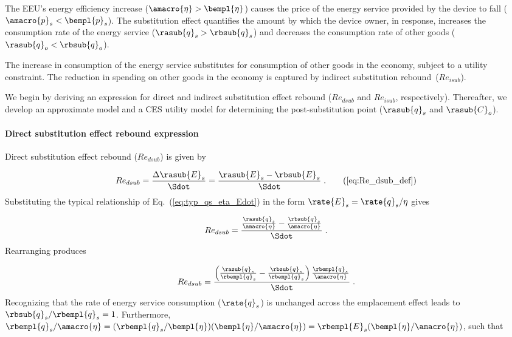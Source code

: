 The EEU's energy efficiency increase
($\amacro{\eta} > \bempl{\eta}$)
causes the price of the energy service provided by the device to fall
($\amacro{p}_s < \bempl{p}_s$).
The substitution effect quantifies the amount by which
the device owner, in response,
increases the consumption rate of the energy service ($\rasub{q}_s > \rbsub{q}_s$) and
decreases the consumption rate of other goods ($\rasub{q}_o < \rbsub{q}_o$).

The increase in consumption of the energy service 
substitutes for consumption of other goods in the economy,
subject to a utility constraint.
The reduction in spending on other goods in the economy
is captured by indirect substitution rebound~($Re_{isub}$).

We begin by deriving an expression for direct and indirect 
substitution effect rebound ($Re_{dsub}$ and $Re_{isub}$, respectively).
Thereafter, we develop an approximate model and a CES utility model for determining the 
post-substitution point ($\rasub{q}_s$ and $\rasub{C}_o$).


\paragraph{Direct substitution effect rebound expression}
\label{sec:Redsub_expression}

Direct substitution effect rebound ($Re_{dsub}$) is given by

\begin{equation}
  Re_{dsub} = \frac{\Delta \rasub{E}_s}{\Sdot} = \frac{\rasub{E}_s - \rbsub{E}_s}{\Sdot} \; . \tag{\ref{eq:Re_dsub_def}}
\end{equation}
%
Substituting the typical relationship of Eq.~(\ref{eq:typ_qs_eta_Edot})
in the form $\rate{E}_s = \rate{q}_s/\eta$ gives

\begin{equation}
  Re_{dsub} = \frac{\frac{\rasub{q}_s}{\amacro{\eta}} - \frac{\rbsub{q}_s}{\amacro{\eta}}}{\Sdot} \; .
\end{equation}
%
Rearranging produces

\begin{equation}
  Re_{dsub} = \frac{ \left( \frac{\rasub{q}_s}{\rbempl{q}_s}
                    - \frac{\rbsub{q}_s}{\rbempl{q}_s}  \right) \frac{\rbempl{q}_s}{\amacro{\eta}} }{\Sdot} \; .
\end{equation}
%
Recognizing that the rate of energy service consumption ($\rate{q}_s$)
is unchanged across the emplacement effect leads to $\rbsub{q}_s/\rbempl{q}_s = 1$.
Furthermore, $\rbempl{q}_s/\amacro{\eta}
            = (\rbempl{q}_s/\bempl{\eta}) (\bempl{\eta}/\amacro{\eta})
            = \rbempl{E}_s (\bempl{\eta}/\amacro{\eta})$,
such that

